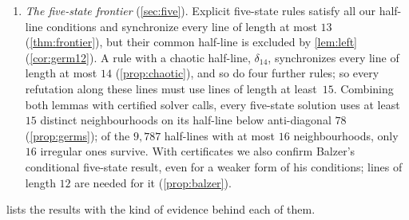 \begin{enumerate}[label=(\roman*)]
  programs.
\item \emph{The five-state frontier} (\cref{sec:five}). Explicit five-state
  rules satisfy all our half-line conditions and synchronize every line of
  length at most $13$ (\cref{thm:frontier}), but their common half-line is
  excluded by \cref{lem:left} (\cref{cor:germ12}). A rule with a chaotic
  half-line, $\delta_{14}$, synchronizes every line of length at most $14$
  (\cref{prop:chaotic}), and so do four further rules; so every refutation
  along these lines must use lines of length at least~$15$. Combining both
  lemmas with certified solver calls, every five-state solution uses at
  least $15$ distinct neighbourhoods on its half-line below anti-diagonal
  $78$ (\cref{prop:germs}); of the $9{,}787$ half-lines with at most $16$
  neighbourhoods, only $16$ irregular ones survive.
  With certificates we also confirm Balzer's conditional five-state result,
  even for a weaker form of his conditions; lines of length $12$ are needed
  for it (\cref{prop:balzer}).
\end{enumerate}
 lists the results with the kind of evidence behind each
of them.

